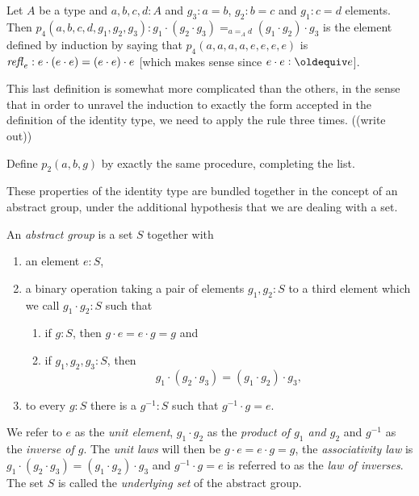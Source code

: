 \begin{definition}\label{def:p4}
  Let $A$ be a type and $a,b,c,d:A$ and $g_3:a=b$, $g_2:b=c$ and $g_1:c=d$ elements.  Then $p_4(a,b,c,d,g_1,g_2,g_3):g_1\cdot(g_2\cdot g_3)=_{a=_Ad}(g_1\cdot g_2)\cdot g_3$ is the element defined by induction by saying that $p_4(a,a,a,a,e,e,e,e)$ is $\mathop{{\it refl}_{e}}:e\cdot(e\cdot e)=(e\cdot e)\cdot e$ [which makes sense since $e\cdot e\defequi e$].
\end{definition}
\begin{remark}
  This last definition is somewhat more complicated than the others, in the sense that in order to unravel the induction to exactly the form accepted in the definition of the identity type, we need to apply the rule three times.  ((write out))
\end{remark}

\begin{xca}\label{xca:p2}
    Define $p_2(a,b,g)$ %
by exactly the same procedure, completing the list.
\end{xca}


These properties of the identity type are bundled together in the concept of an abstract group, under the additional hypothesis that we are dealing with a set.

  \begin{definition}\label{def:abstractgroup}
    An \emph{abstract group} is a set $S$ together with
\begin{enumerate}
\item an element $e:S$,
\item a binary operation taking a pair of elements $g_1,g_2:S$ to a third element which we call $g_1\cdot g_2:S$ such that
  \begin{enumerate}
  \item %
if $g:S$, then $g\cdot e=e\cdot g=g$ and
  \item %
if $g_1,g_2,g_3:S$, then
$$g_1\cdot(g_2\cdot g_3)=(g_1\cdot g_2)\cdot g_3,$$
  \end{enumerate}
\item %
to every $g:S$ there is a $g^{-1}:S$ such that $%
g^{-1}\cdot g=e$.
\end{enumerate}
We refer to $e$ as the \emph{unit element}, $g_1\cdot g_2$ as the \emph{product of $g_1$ and $g_2$} and $g^{-1}$ as the \emph{inverse of $g$}.  The \emph{unit laws} will then be $g\cdot e=e\cdot g=g$, the \emph{associativity law} is $g_1\cdot(g_2\cdot g_3)=(g_1\cdot g_2)\cdot g_3$ and $%
g^{-1}\cdot g=e$ is referred to as the \emph{law of inverses}.  The set $S$ is called the \emph{underlying set} of the abstract group.
  \end{definition}

